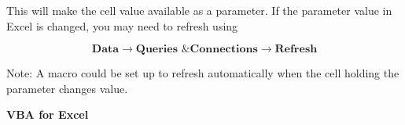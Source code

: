 \documentclass[8pt]{extarticle}
\begin{document}
\begin{multicols}{3}
This will make the cell value available as a parameter. If the parameter value in Excel is changed, you may need to refresh using

\[\textbf{Data} \rightarrow \textbf{Queries \& Connections} \rightarrow \textbf{Refresh}\]

Note: A macro could be set up to refresh automatically when the cell holding the parameter changes value.

\vspace*{\fill}
\end{multicols}


\newpage
\thispagestyle{empty} 
\begin{center}   
{\huge\textbf{VBA for Excel}}\\
\vspace*{0.75cm}
\end{center}
\end{document}
